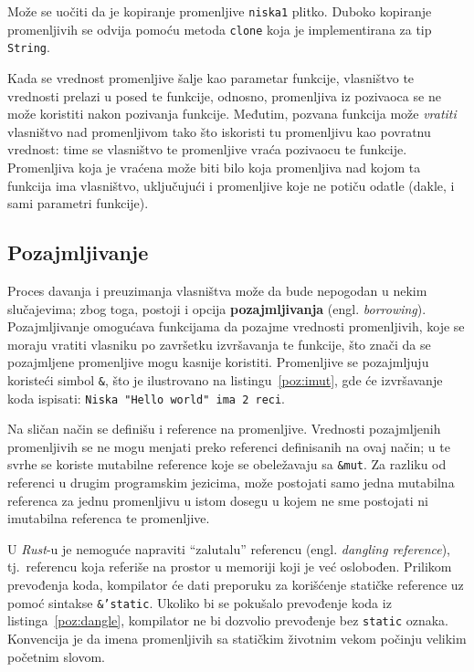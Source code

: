 \documentclass[12pt,oneside]{memoir}
\begin{document}
Može se uočiti da je kopiranje promenljive \texttt{niska1} plitko. Duboko kopiranje promenljivih
se odvija pomoću metoda \texttt{clone} koja je implementirana za tip \texttt{String}.


Kada se vrednost promenljive šalje kao parametar funkcije, vlasništvo te vrednosti prelazi
u posed te funkcije, odnosno, promenljiva iz pozivaoca se ne može koristiti nakon pozivanja funkcije.
Međutim, pozvana funkcija može \emph{vratiti} vlasništvo nad promenljivom tako što iskoristi tu
promenljivu kao povratnu vrednost: time se vlasništvo te promenljive vraća pozivaocu te funkcije.
Promenljiva koja je vraćena može biti bilo koja promenljiva nad kojom ta funkcija ima vlasništvo,
uključujući i promenljive koje ne potiču odatle (dakle, i sami parametri funkcije).

\subsection{Pozajmljivanje}\label{subsec:pozajmljivanje}
Proces davanja i preuzimanja vlasništva može da bude nepogodan u nekim slučajevima; zbog toga,
postoji i opcija \textbf{pozajmljivanja} (engl. \emph{borrowing}). Pozajmljivanje omogućava
funkcijama da pozajme vrednosti promenljivih, koje se moraju vratiti vlasniku po završetku
izvršavanja te funkcije, što znači da se pozajmljene promenljive mogu kasnije koristiti.
Promenljive se pozajmljuju koristeći simbol \texttt{\&}, što je ilustrovano na
listingu~\ref{poz:imut}, gde će izvršavanje koda ispisati: \texttt{Niska "Hello world"
ima 2 reci}.



Na sličan način se definišu i reference na promenljive. Vrednosti pozajmljenih promenljivih se ne
mogu menjati preko referenci definisanih na ovaj način; u te svrhe
se koriste mutabilne reference koje se obeležavaju sa \texttt{\&mut}. Za razliku od referenci
u drugim programskim jezicima, može postojati samo jedna mutabilna referenca za jednu
promenljivu u istom dosegu u kojem ne sme postojati ni imutabilna referenca te promenljive.

U \emph{Rust}-u je nemoguće napraviti ``zalutalu'' referencu (engl. \emph{dangling reference}),
tj.\ referencu koja referiše na prostor u memoriji koji je već oslobođen. Prilikom prevođenja
koda, kompilator će dati preporuku za korišćenje statičke reference uz pomoć sintakse
\texttt{\&'static}. Ukoliko bi se pokušalo prevođenje koda iz listinga~\ref{poz:dangle},
kompilator ne bi dozvolio prevođenje bez \texttt{static} oznaka. Konvencija je da imena
promenljivih sa statičkim životnim vekom počinju velikim početnim slovom.
\end{document}
